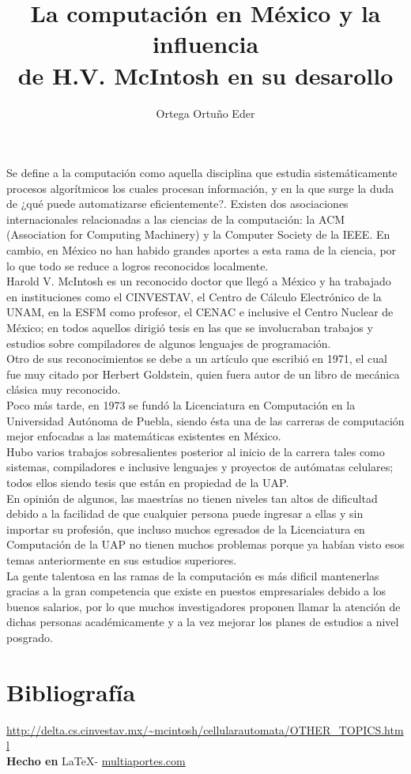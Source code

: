 \documentclass{article}
\title{La computación en México y la influencia \\de H.V. McIntosh en su desarollo}
\author{Ortega Ortu\~no Eder}
\date{} %
\begin{document}
	\maketitle
	\normalsize{
Se define a la computación como aquella disciplina que estudia sistemáticamente procesos algorítmicos los cuales procesan información, y en la que surge la duda de ¿qué puede automatizarse eficientemente?. Existen dos asociaciones internacionales relacionadas a las ciencias de la computación: la ACM (Association for Computing Machinery) y la Computer Society de la IEEE. En cambio, en México no han habido grandes aportes a esta rama de la ciencia, por lo que todo se reduce a logros reconocidos localmente.
\\

Harold V. McIntosh es un reconocido doctor que llegó a México y ha trabajado en instituciones como el CINVESTAV, el Centro de Cálculo Electrónico de la UNAM, en la ESFM como profesor, el CENAC e inclusive el Centro Nuclear de México; en todos aquellos dirigió tesis en las que se involucraban trabajos y estudios sobre compiladores de algunos lenguajes de programación.
\\

Otro de sus reconocimientos se debe a un artículo que escribió en 1971, el cual fue muy citado por Herbert Goldstein, quien fuera autor de un libro de mecánica clásica muy reconocido.
\\

Poco más tarde, en 1973 se fundó la Licenciatura en Computación en la Universidad Autónoma de Puebla, siendo ésta una de las carreras de computación mejor enfocadas a las matemáticas existentes en México.
\\

Hubo varios trabajos sobresalientes posterior al inicio de la carrera tales como sistemas, compiladores e inclusive lenguajes y proyectos de autómatas celulares; todos ellos siendo tesis que están en propiedad de la UAP.
\\

En opinión de algunos, las maestrías no tienen niveles tan altos de dificultad debido a la facilidad de que cualquier persona puede ingresar a ellas y sin importar su profesión, que incluso muchos egresados de la Licenciatura en Computación de la UAP no tienen muchos problemas porque ya habían visto esos temas anteriormente en sus estudios superiores.
\\

La gente talentosa en las ramas de la computación es más dificil mantenerlas gracias a la gran competencia que existe en puestos empresariales debido a los buenos salarios, por lo que muchos investigadores proponen llamar la atención de dichas personas académicamente y a la vez mejorar los planes de estudios a nivel posgrado.
}

\vspace{2cm}

\section*{Bibliograf\'ia}

\noindent \url{http://delta.cs.cinvestav.mx/~mcintosh/cellularautomata/OTHER_TOPICS.html}
\\

\large{\hfill \textbf{Hecho en } \LaTeX - \url{multiaportes.com}}
\end{document}
